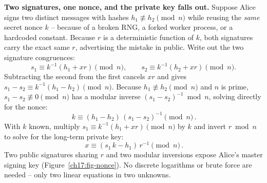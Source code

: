 \begin{attackbox}
\textbf{Two signatures, one nonce, and the private key falls out.} Suppose Alice signs two distinct messages with hashes $h_1 \not\equiv h_2 \pmod n$ while reusing the \emph{same} secret nonce $k$ -- because of a broken RNG, a forked worker process, or a hardcoded constant. Because $r$ is a deterministic function of $k$, both signatures carry the exact same $r$, advertising the mistake in public. Write out the two signature congruences:
\[
  s_1 \equiv k^{-1}(h_1 + x r) \pmod n, \qquad s_2 \equiv k^{-1}(h_2 + x r) \pmod n.
\]
Subtracting the second from the first cancels $x r$ and gives $s_1 - s_2 \equiv k^{-1}(h_1 - h_2) \pmod n$. Because $h_1 \not\equiv h_2 \pmod n$ and $n$ is prime, $s_1 - s_2 \not\equiv 0 \pmod n$ has a modular inverse $(s_1 - s_2)^{-1} \bmod n$, solving directly for the nonce:
\[
  \boxed{\,k \equiv (h_1 - h_2)\,(s_1 - s_2)^{-1} \pmod n\,}.
\]
With $k$ known, multiply $s_1 \equiv k^{-1}(h_1 + xr) \pmod n$ by $k$ and invert $r \bmod n$ to solve for the long-term private key:
\[
  \boxed{\,x \equiv (s_1\,k - h_1)\,r^{-1} \pmod n\,}.
\]
Two public signatures sharing $r$ and two modular inversions expose Alice's master signing key (Figure~\ref{ch17:fig-nonce}). No discrete logarithms or brute force are needed -- only two linear equations in two unknowns.
\end{attackbox}

